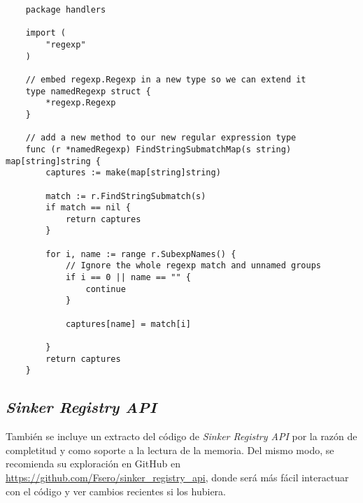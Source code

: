 
\begin{verbatim}
    package handlers
    
    import (
        "regexp"
    )
    
    // embed regexp.Regexp in a new type so we can extend it
    type namedRegexp struct {
        *regexp.Regexp
    }
    
    // add a new method to our new regular expression type
    func (r *namedRegexp) FindStringSubmatchMap(s string) map[string]string {
        captures := make(map[string]string)
    
        match := r.FindStringSubmatch(s)
        if match == nil {
            return captures
        }
    
        for i, name := range r.SubexpNames() {
            // Ignore the whole regexp match and unnamed groups
            if i == 0 || name == "" {
                continue
            }
    
            captures[name] = match[i]
    
        }
        return captures
    }    
\end{verbatim}

\subsection{\emph{Sinker Registry API}}
\label{subsec:sinker-registry-api-src-code}
También se incluye un extracto del código de \emph{Sinker Registry API} por la razón de completitud y como soporte a la lectura de la memoria. Del mismo modo, se recomienda su exploración en GitHub en \href{https://github.com/Fsero/sinker\_registry\_api}{https://github.com/Fsero/sinker\_registry\_api}, donde será más fácil interactuar con el código y ver cambios recientes si los 
hubiera.

